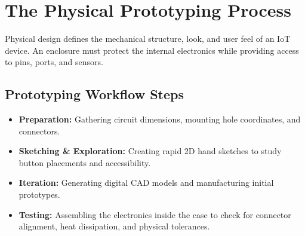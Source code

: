 \documentclass[12pt,a4paper]{article}
\begin{document}
\section{The Physical Prototyping Process}

Physical design defines the mechanical structure, look, and user feel of an IoT device. An enclosure must protect the internal electronics while providing access to pins, ports, and sensors.

\subsection{Prototyping Workflow Steps}
\begin{itemize}[leftmargin=*, itemsep=3pt]
  \item \textbf{Preparation:} Gathering circuit dimensions, mounting hole coordinates, and connectors.
  \item \textbf{Sketching \& Exploration:} Creating rapid 2D hand sketches to study button placements and accessibility.
  \item \textbf{Iteration:} Generating digital CAD models and manufacturing initial prototypes.
  \item \textbf{Testing:} Assembling the electronics inside the case to check for connector alignment, heat dissipation, and physical tolerances.
\end{itemize}
\end{document}
